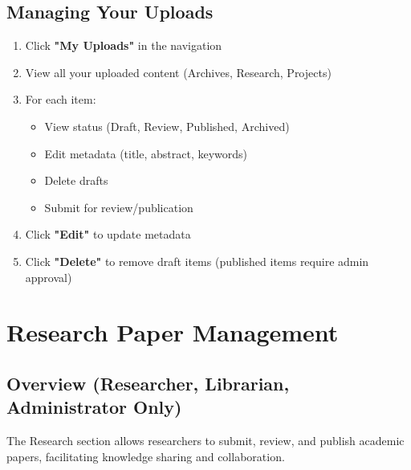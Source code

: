 \documentclass[12pt,a4paper]{article}
\begin{document}
\subsection{Managing Your Uploads}
\begin{enumerate}[leftmargin=*]
    \item Click \textbf{"My Uploads"} in the navigation
    \item View all your uploaded content (Archives, Research, Projects)
    \item For each item:
        \begin{itemize}
            \item View status (Draft, Review, Published, Archived)
            \item Edit metadata (title, abstract, keywords)
            \item Delete drafts
            \item Submit for review/publication
        \end{itemize}
    \item Click \textbf{"Edit"} to update metadata
    \item Click \textbf{"Delete"} to remove draft items (published items require admin approval)
\end{enumerate}

\newpage

\section{Research Paper Management}

\subsection{Overview (Researcher, Librarian, Administrator Only)}
The Research section allows researchers to submit, review, and publish academic papers, facilitating knowledge sharing and collaboration.
\end{document}
